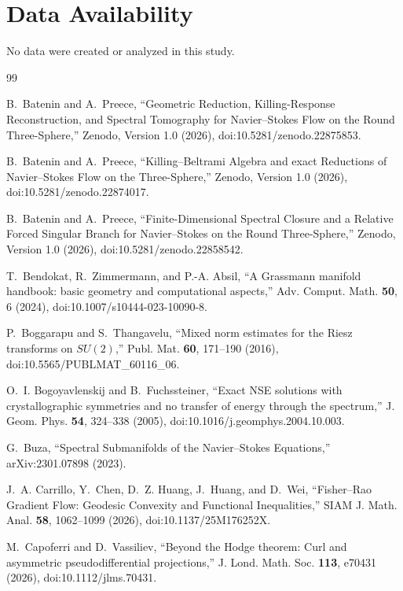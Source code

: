 \documentclass[
 aps,
 prd,
 reprint,
 amsmath,
 amssymb,
 nofootinbib,
 superscriptaddress
]{revtex4-2}
\theoremstyle{definition}
\theoremstyle{remark}
\begin{document}
\section*{Data Availability}
No data were created or analyzed in this study.

\begin{thebibliography}{99}


B.~Batenin and A.~Preece,
``Geometric Reduction, Killing-Response Reconstruction, and Spectral
Tomography for Navier--Stokes Flow on the Round Three-Sphere,''
Zenodo, Version 1.0 (2026),
doi:10.5281/zenodo.22875853.


B.~Batenin and A.~Preece,
``Killing--Beltrami Algebra and exact Reductions of Navier--Stokes Flow on
the Three-Sphere,''
Zenodo, Version 1.0 (2026),
doi:10.5281/zenodo.22874017.

B.~Batenin and A.~Preece,
``Finite-Dimensional Spectral Closure and a Relative Forced Singular Branch
for Navier--Stokes on the Round Three-Sphere,''
Zenodo, Version 1.0 (2026),
doi:10.5281/zenodo.22858542.

T.~Bendokat, R.~Zimmermann, and P.-A. Absil,
``A Grassmann manifold handbook: basic geometry and computational aspects,''
Adv. Comput. Math. \textbf{50}, 6 (2024),
doi:10.1007/s10444-023-10090-8.

P.~Boggarapu and S.~Thangavelu,
``Mixed norm estimates for the Riesz transforms on $SU(2)$,''
Publ. Mat. \textbf{60}, 171--190 (2016),
doi:10.5565/PUBLMAT\_60116\_06.

O.~I. Bogoyavlenskij and B.~Fuchssteiner,
``Exact NSE solutions with crystallographic symmetries and no transfer of
energy through the spectrum,''
J. Geom. Phys. \textbf{54}, 324--338 (2005),
doi:10.1016/j.geomphys.2004.10.003.

G.~Buza,
``Spectral Submanifolds of the Navier--Stokes Equations,''
arXiv:2301.07898 (2023).


J.~A. Carrillo, Y.~Chen, D.~Z. Huang, J.~Huang, and D.~Wei,
``Fisher--Rao Gradient Flow: Geodesic Convexity and Functional Inequalities,''
SIAM J. Math. Anal. \textbf{58}, 1062--1099 (2026),
doi:10.1137/25M176252X.

M.~Capoferri and D.~Vassiliev,
``Beyond the Hodge theorem: Curl and asymmetric pseudodifferential projections,''
J. Lond. Math. Soc. \textbf{113}, e70431 (2026),
doi:10.1112/jlms.70431.


\end{thebibliography}
\end{document}
